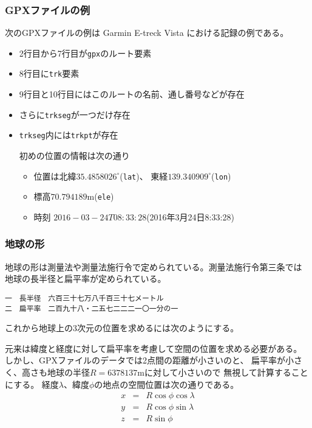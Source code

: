 \subsubsection{GPXファイルの例}
次のGPXファイルの例は Garmin E-treck Vista における記録の例である。
 \begin{itemize}
  \item 2行目から7行目が\texttt{gpx}のルート要素
  \item 8行目に\texttt{trk}要素
  \item 9行目と10行目にはこのルートの名前、通し番号などが存在
  \item さらに\texttt{trkseg}が一つだけ存在
  \item \texttt{trkseg}内には\texttt{trkpt}が存在

        初めの位置の情報は次の通り
        \begin{itemize}
         \item 位置は北緯$35.4858026^{\circ}$(\texttt{lat})、
               東経$139.340909^{\circ}$(\texttt{lon})
         \item 標高$70.794189\mathrm{m}$(\texttt{ele})
         \item 時刻 $2016-03-24T08:33:28$(2016年3月24日8:33:28)
        \end{itemize}
 \end{itemize}
\subsubsection{地球の形}
地球の形は測量法や測量法施行令で定められている。測量法施行令第三条では
地球の長半径と扁平率が定められている。
\begin{Verbatim}
一　長半径　六百三十七万八千百三十七メートル
二　扁平率　二百九十八・二五七二二二一〇一分の一
\end{Verbatim}
これから地球上の3次元の位置を求めるには次のようにする。

元来は緯度と経度に対して扁平率を考慮して空間の位置を求める必要がある。
しかし、GPXファイルのデータでは2点間の距離が小さいのと、
扁平率が小さく、高さも地球の半径$R=6378137\mathrm{m}$に対して小さいので
 無視して計算することにする。
  経度$\lambda$、緯度$\phi$の地点の空間位置は次の通りである。
				\begin{eqnarray*}
				 x &=& R\cos\phi\cos\lambda\\
				 y &=& R\cos\phi\sin\lambda\\
				 z &=& R\sin\phi
				\end{eqnarray*}
